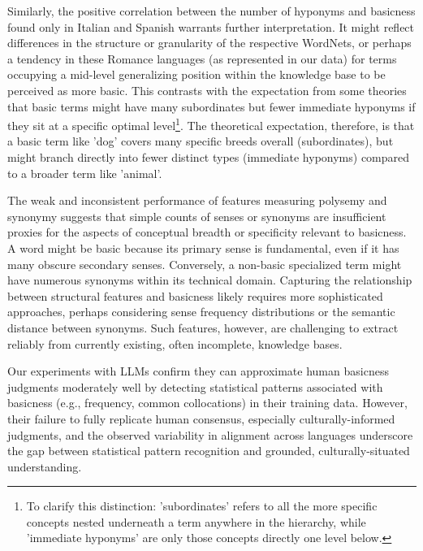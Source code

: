 \documentclass[preprint,12pt,authoryear]{elsarticle}
\begin{document}
Similarly, the positive correlation between the number of hyponyms and basicness found only in Italian and Spanish warrants further interpretation. It might reflect differences in the structure or granularity of the respective WordNets, or perhaps a tendency in these Romance languages (as represented in our data) for terms occupying a mid-level generalizing position within the knowledge base to be perceived as more basic. This contrasts with the expectation from some theories that basic terms might have many subordinates but fewer immediate hyponyms if they sit at a specific optimal level\footnote{To clarify this distinction: 'subordinates' refers to all the more specific concepts nested underneath a term anywhere in the hierarchy, while 'immediate hyponyms' are only those concepts directly one level below.}. The theoretical expectation, therefore, is that a basic term like 'dog' covers many specific breeds overall (subordinates), but might branch directly into fewer distinct types (immediate hyponyms) compared to a broader term like 'animal'.

The weak and inconsistent performance of features measuring polysemy and synonymy suggests that simple counts of senses or synonyms are insufficient proxies for the aspects of conceptual breadth or specificity relevant to basicness. A word might be basic because its primary sense is fundamental, even if it has many obscure secondary senses. Conversely, a non-basic specialized term might have numerous synonyms within its technical domain. Capturing the relationship between structural features and basicness likely requires more sophisticated approaches, perhaps considering sense frequency distributions or the semantic distance between synonyms. Such features, however, are challenging to extract reliably from currently existing, often incomplete, knowledge bases.

Our experiments with LLMs confirm they can approximate human basicness judgments moderately well by detecting statistical patterns associated with basicness (e.g., frequency, common collocations) in their training data. However, their failure to fully replicate human consensus, especially culturally-informed judgments, and the observed variability in alignment across languages underscore the gap between statistical pattern recognition and grounded, culturally-situated understanding.
\end{document}
